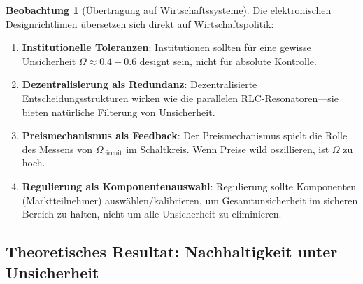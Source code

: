 \documentclass[a4paper, 12pt, twoside, openright]{report}
\theoremstyle{definition}
\newtheorem{beobachtung}{Beobachtung}
\theoremstyle{definition}
\begin{document}
\begin{beobachtung}[Übertragung auf Wirtschaftssysteme]

Die elektronischen Designrichtlinien übersetzen sich direkt auf Wirtschaftspolitik:

\begin{enumerate}
    \item \textbf{Institutionelle Toleranzen}: Institutionen sollten für eine gewisse Unsicherheit $\Omega \approx 0.4-0.6$ designt sein, nicht für absolute Kontrolle.
    
    \item \textbf{Dezentralisierung als Redundanz}: Dezentralisierte Entscheidungsstrukturen wirken wie die parallelen RLC-Resonatoren—sie bieten natürliche Filterung von Unsicherheit.
    
    \item \textbf{Preismechanismus als Feedback}: Der Preismechanismus spielt die Rolle des Messens von $\Omega_{\text{circuit}}$ im Schaltkreis. Wenn Preise wild oszillieren, ist $\Omega$ zu hoch.
    
    \item \textbf{Regulierung als Komponentenauswahl}: Regulierung sollte Komponenten (Marktteilnehmer) auswählen/kalibrieren, um Gesamtunsicherheit im sicheren Bereich zu halten, nicht um alle Unsicherheit zu eliminieren.
\end{enumerate}

\end{beobachtung}

\subsection{Theoretisches Resultat: Nachhaltigkeit unter Unsicherheit}
\end{document}
